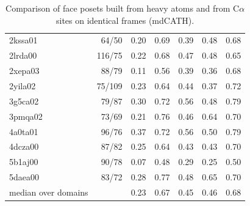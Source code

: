 \begin{table}[H]
\begin{tabular}{lrrrrrr}
2kssa01 & 64/50 & 0.20 & 0.69 & 0.39 & 0.48 & 0.68\\
2lrda00 & 116/75 & 0.22 & 0.68 & 0.47 & 0.48 & 0.65\\
2xepa03 & 88/79 & 0.11 & 0.56 & 0.39 & 0.36 & 0.68\\
2yila02 & 75/109 & 0.23 & 0.64 & 0.44 & 0.37 & 0.72\\
3g5ca02 & 79/87 & 0.30 & 0.72 & 0.56 & 0.48 & 0.79\\
3pmqa02 & 73/69 & 0.21 & 0.76 & 0.46 & 0.64 & 0.70\\
4a0ta01 & 96/76 & 0.37 & 0.72 & 0.56 & 0.50 & 0.79\\
4dcza00 & 87/82 & 0.25 & 0.64 & 0.43 & 0.43 & 0.70\\
5b1aj00 & 90/78 & 0.07 & 0.48 & 0.29 & 0.25 & 0.50\\
5daea00 & 83/72 & 0.28 & 0.77 & 0.48 & 0.65 & 0.70\\
\midrule
median over domains & & 0.23 & 0.67 & 0.45 & 0.46 & 0.68\\
\bottomrule\end{tabular}\caption{Comparison of face posets built from heavy atoms and from C$\alpha$ sites on identical frames (mdCATH).}\label{tab:functor}\end{table}
